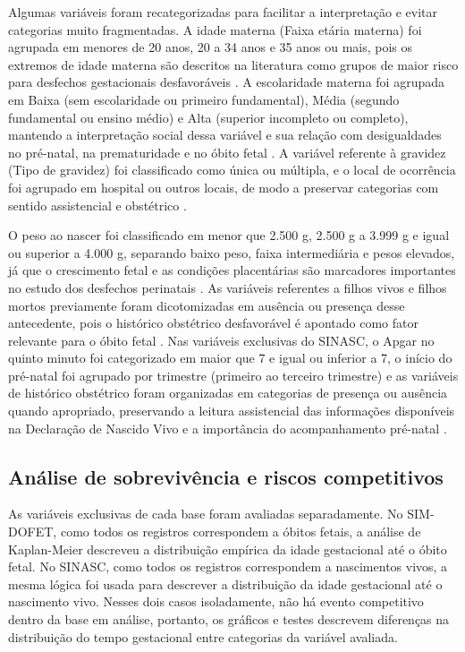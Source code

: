 Algumas variáveis foram recategorizadas para facilitar a interpretação e evitar 
categorias muito fragmentadas. A idade materna (Faixa etária materna) foi agrupada 
em menores de 20 anos, 20 a 34 anos e 35 anos ou mais, pois os extremos de idade 
materna são descritos na literatura como grupos de maior risco para desfechos 
gestacionais desfavoráveis \cite{Victor2025PretermBrazil,ACOG2020Stillbirth}. A escolaridade 
materna foi agrupada em Baixa (sem escolaridade ou primeiro fundamental), Média 
(segundo fundamental ou ensino médio) e Alta (superior incompleto ou completo), mantendo 
a interpretação social dessa variável e sua relação com desigualdades no pré-natal, 
na prematuridade e no óbito fetal \cite{Marques2026FetRiskS,Silva2026PrenatalInequities}. 
A variável referente à gravidez (Tipo de gravidez) foi classificado como única ou múltipla, 
e o local de ocorrência foi agrupado em hospital ou outros locais, de modo a preservar 
categorias com sentido assistencial e obstétrico \cite{ACOG2020Stillbirth,Sun2018}. 

O peso ao nascer foi classificado em menor que 2.500 g, 2.500 g a 3.999 g e igual 
ou superior a 4.000 g, separando baixo peso, faixa intermediária e pesos elevados, 
já que o crescimento fetal e as condições placentárias são marcadores importantes no 
estudo dos desfechos perinatais \cite{gardosi2013maternal,smith2007stillbirth,pinar2014placental}. 
As variáveis referentes a filhos vivos e filhos mortos previamente foram dicotomizadas 
em ausência ou presença desse antecedente, pois o histórico obstétrico desfavorável é 
apontado como fator relevante para o óbito fetal \cite{Lawn2016,ACOG2020Stillbirth,Sun2018}. 
Nas variáveis exclusivas do SINASC, o Apgar no quinto minuto foi categorizado em 
maior que 7 e igual ou inferior a 7, o início do pré-natal foi agrupado por trimestre 
(primeiro ao terceiro trimestre) e as variáveis de histórico obstétrico foram 
organizadas em categorias de presença ou ausência quando apropriado, preservando 
a leitura assistencial das informações disponíveis na Declaração de Nascido Vivo 
e a importância do acompanhamento pré-natal \cite{ministerioSaudeDNV2022,Silva2026PrenatalInequities}.

\subsection{Análise de sobrevivência e riscos competitivos}

As variáveis exclusivas de cada base foram avaliadas separadamente. No SIM-DOFET,
como todos os registros correspondem a óbitos fetais, a análise de Kaplan-Meier
descreveu a distribuição empírica da idade gestacional até o óbito fetal. No
SINASC, como todos os registros correspondem a nascimentos vivos, a mesma lógica
foi usada para descrever a distribuição da idade gestacional até o nascimento
vivo. Nesses dois casos isoladamente, não há evento competitivo dentro da base em
análise, portanto, os gráficos e testes descrevem diferenças na distribuição do
tempo gestacional entre categorias da variável avaliada.

